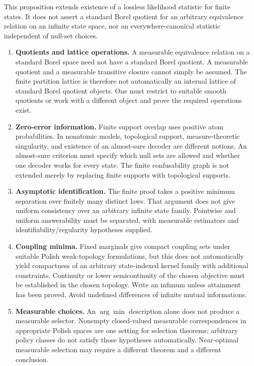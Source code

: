 This proposition extends existence of a lossless likelihood statistic for finite states. It does not assert a standard Borel quotient for an arbitrary equivalence relation on an infinite state space, nor an everywhere-canonical statistic independent of null-set choices.


\begin{enumerate}
\def\labelenumi{\arabic{enumi}.}
\tightlist
\item
  \textbf{Quotients and lattice operations.} A measurable equivalence relation on a standard Borel space need not have a standard Borel quotient. A measurable quotient and a measurable transitive closure cannot simply be assumed. The finite partition lattice is therefore not automatically an internal lattice of standard Borel quotient objects. One must restrict to suitable smooth quotients or work with a different object and prove the required operations exist.
\item
  \textbf{Zero-error information.} Finite support overlap uses positive atom probabilities. In nonatomic models, topological support, measure-theoretic singularity, and existence of an almost-sure decoder are different notions. An almost-sure criterion must specify which null sets are allowed and whether one decoder works for every state. The finite confusability graph is not extended merely by replacing finite supports with topological supports.
\item
  \textbf{Asymptotic identification.} The finite proof takes a positive minimum separation over finitely many distinct laws. That argument does not give uniform consistency over an arbitrary infinite state family. Pointwise and uniform answerability must be separated, with measurable estimators and identifiability/regularity hypotheses supplied.
\item
  \textbf{Coupling minima.} Fixed marginals give compact coupling sets under suitable Polish weak-topology formulations, but this does not automatically yield compactness of an arbitrary state-indexed kernel family with additional constraints. Continuity or lower semicontinuity of the chosen objective must be established in the chosen topology. Write an infimum unless attainment has been proved. Avoid undefined differences of infinite mutual informations.
\item
  \textbf{Measurable choices.} An \(\arg\min\) description alone does not produce a measurable selector. Nonempty closed-valued measurable correspondences in appropriate Polish spaces are one setting for selection theorems; arbitrary policy classes do not satisfy those hypotheses automatically. Near-optimal measurable selection may require a different theorem and a different conclusion.

\end{enumerate}

